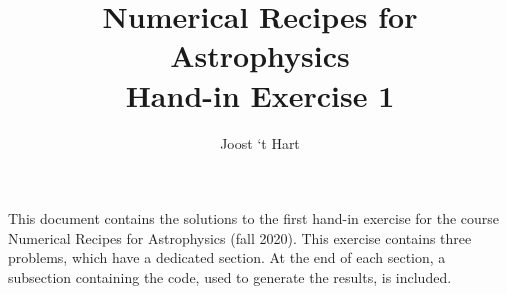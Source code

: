\documentclass[a4paper,10pt]{article}
\title{Numerical Recipes for Astrophysics \\Hand-in Exercise 1}
\author{Joost `t Hart}
\begin{document}
\maketitle
This document contains the solutions to the first hand-in exercise for the course Numerical Recipes for Astrophysics (fall 2020).  This exercise contains three problems, which have a dedicated section. At the end of each section, a subsection containing the code, used to generate the results, is included.






\end{document}
